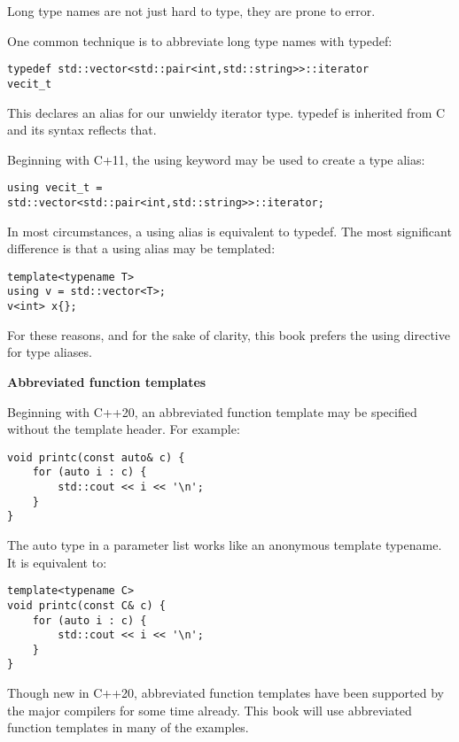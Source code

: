 Long type names are not just hard to type, they are prone to error.

One common technique is to abbreviate long type names with typedef:

\begin{lstlisting}[style=styleCXX]
typedef std::vector<std::pair<int,std::string>>::iterator
vecit_t
\end{lstlisting}

This declares an alias for our unwieldy iterator type. typedef is inherited from C and its syntax reflects that.

Beginning with C+11, the using keyword may be used to create a type alias:

\begin{lstlisting}[style=styleCXX]
using vecit_t =
std::vector<std::pair<int,std::string>>::iterator;
\end{lstlisting}

In most circumstances, a using alias is equivalent to typedef. The most significant difference is that a using alias may be templated:

\begin{lstlisting}[style=styleCXX]
template<typename T>
using v = std::vector<T>;
v<int> x{};
\end{lstlisting}

For these reasons, and for the sake of clarity, this book prefers the using directive for type aliases.

\noindent
\textbf{Abbreviated function templates}

Beginning with C++20, an abbreviated function template may be specified without the template header. For example:

\begin{lstlisting}[style=styleCXX]
void printc(const auto& c) {
	for (auto i : c) {
		std::cout << i << '\n';
	}
}
\end{lstlisting}

The auto type in a parameter list works like an anonymous template typename. It is equivalent to:

\begin{lstlisting}[style=styleCXX]
template<typename C>
void printc(const C& c) {
	for (auto i : c) {
		std::cout << i << '\n';
	}
}
\end{lstlisting}

Though new in C++20, abbreviated function templates have been supported by the major compilers for some time already. This book will use abbreviated function templates in many of the examples.

